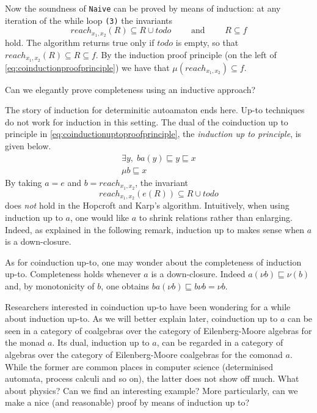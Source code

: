 \documentclass{llncs}
\begin{document}
Now the soundness of \texttt{Naive} can be proved by means of induction: at any iteration of the while loop \texttt{(3)} the invariants
$$reach_{x_1,x_2}(R) \subseteq R\cup todo \qquad \text{ and } \qquad R\subseteq f$$
hold. The algorithm returns true only if $todo$ is empty, so that $reach_{x_1,x_2}(R) \subseteq R \subseteq f$. By the induction proof principle (on the left of \eqref{eq:coinductionproofprinciple}) we have that  $\mu (reach_{x_1,x_2}) \subseteq f$.
\begin{question} 
Can we elegantly prove completeness using an inductive approach?
\end{question}

The story of induction for determinitic autoamaton ends here. Up-to techniques do not work for induction in this setting. The dual of the coinduction up to principle in \eqref{eq:coinductionuptoproofprinciple}, the \emph{induction up to principle}, is given below.
\begin{equation}\label{eq:inductionuptoproofprinciple}
 \begin{array}{c}
    \exists y, \;  ba(y) \sqsubseteq y\sqsubseteq x \\
    \hline %
    \mu b \sqsubseteq x
\end{array}
\end{equation}
By taking $a=e$ and $b= reach_{x_1,x_2}$, the invariant 
$$reach_{x_1,x_2}(e(R)) \subseteq R\cup todo $$
does \emph{not} hold in the Hopcroft and Karp's algorithm. Intuitively, when using induction up to $a$, one would like $a$ to shrink relations rather than enlarging. Indeed, as explained in the following remark, induction up to makes sense when $a$ is a down-closure.
\begin{remark}
As for coinduction up-to, one may wonder about the completeness of induction up-to. Completeness holds whenever $a$ is a down-closure. Indeed $a(\nu b)\sqsubseteq \nu(b)$ and, by monotonicity of $b$, one obtains $ba(\nu b)\sqsubseteq b\nu b  = \nu b $.
\end{remark}

\begin{question}
Researchers interested in coinduction up-to have been wondering for a while about induction up-to. As we will better explain later, coinduction up to $a$ can be seen in a category of coalgebras over the category of Eilenberg-Moore algebras for the monad $a$. Its dual, induction up to $a$, can be regarded in a  category of algebras over the category of Eilenberg-Moore coalgebras for the comonad $a$. While the former are common places in computer science (determinised automata, process calculi and so on), the latter does not show off much. What about physics? Can we find an interesting example? More particularly, can we make a nice (and reasonable) proof by means of induction up to? 
\end{question}%
\end{document}
